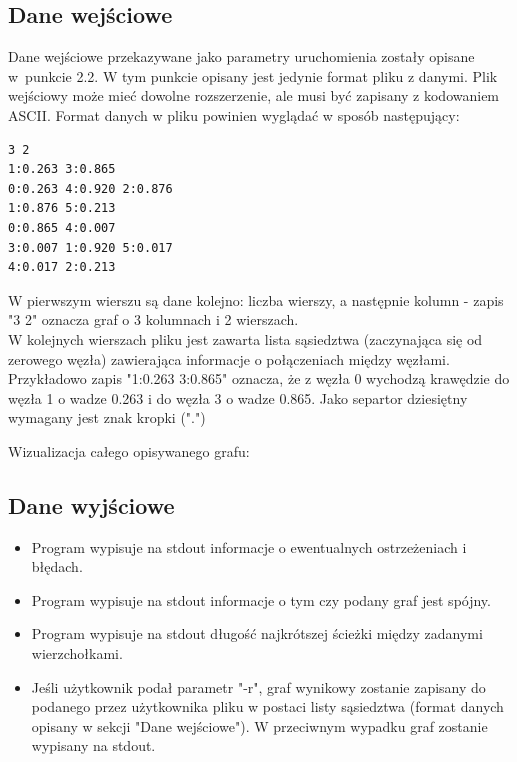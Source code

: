 \documentclass{article}
\begin{document}
\subsection{Dane wejściowe}
Dane wejściowe przekazywane jako parametry uruchomienia zostały opisane w~punkcie 2.2.
W tym punkcie opisany jest jedynie format pliku z danymi. Plik wejściowy może mieć dowolne rozszerzenie, ale musi być zapisany z kodowaniem ASCII. Format danych w pliku powinien wyglądać w sposób następujący:
\begin{lstlisting}
3 2
1:0.263 3:0.865
0:0.263 4:0.920 2:0.876
1:0.876 5:0.213
0:0.865 4:0.007
3:0.007 1:0.920 5:0.017
4:0.017 2:0.213
\end{lstlisting}
W pierwszym wierszu są dane kolejno: liczba wierszy, a następnie kolumn - zapis "3 2" oznacza graf o 3 kolumnach i 2 wierszach.
\\
W kolejnych wierszach pliku jest zawarta lista sąsiedztwa (zaczynająca się od zerowego węzła) zawierająca informacje o połączeniach między węzłami. Przykładowo zapis "1:0.263 3:0.865" oznacza, że z węzła 0 wychodzą krawędzie do węzła 1 o wadze 0.263 i do węzła 3 o wadze 0.865. Jako separtor dziesiętny wymagany jest znak kropki (".")

\newpage
Wizualizacja całego opisywanego grafu:
{ \\ }

\subsection{Dane wyjściowe}
\begin{itemize}
\item Program wypisuje na stdout informacje o ewentualnych ostrzeżeniach i błędach.
\item Program wypisuje na stdout informacje o tym czy podany graf jest spójny.
\item Program wypisuje na stdout długość najkrótszej ścieżki między zadanymi wierzchołkami.
\item Jeśli użytkownik podał parametr "-r", graf wynikowy zostanie zapisany do podanego przez użytkownika pliku w postaci listy sąsiedztwa (format danych opisany w sekcji "Dane wejściowe"). W przeciwnym wypadku graf zostanie wypisany na stdout.
\end{itemize}
\end{document}
